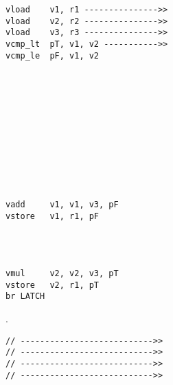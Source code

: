 \begin{figure*}[t]
\centering
\begin{subfigure}[b]{0.325\textwidth}
\begin{lstlisting}[escapechar=|,language=PretendAsm]
vload    v1, r1 --------------->>
vload    v2, r2 --------------->>
vload    v3, r3 --------------->>
vcmp_lt  pT, v1, v2 ----------->>
vcmp_le  pF, v1, v2












vadd     v1, v1, v3, pF
vstore   v1, r1, pF




vmul     v2, v2, v3, pT
vstore   v2, r1, pT
br LATCH
\end{lstlisting}
\caption{\ifconv.}
\label{fig:simple-loop-ifconv}
\end{subfigure}%
\begin{subfigure}[b]{0.325\textwidth}
\begin{lstlisting}[escapechar=|,language=PretendAsm]
// --------------------------->>
// --------------------------->>
// --------------------------->>
// --------------------------->>





\end{lstlisting}
\end{subfigure}
\end{figure*}
